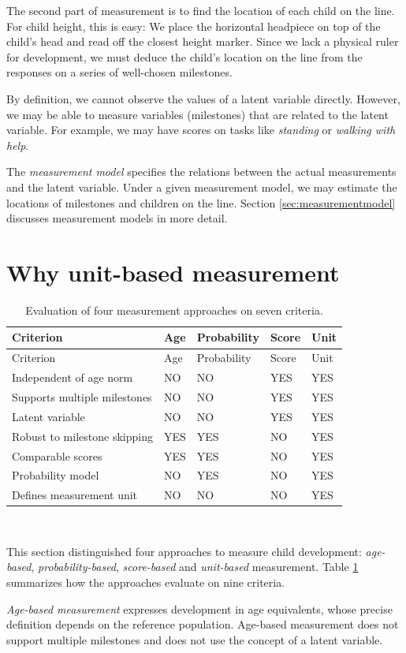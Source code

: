 \documentclass[
]{book}
\begin{document}
The second part of measurement is to find the location of each child on the line. For child height, this is easy: We place the horizontal headpiece on top of the child's head and read off the closest height marker. Since we lack a physical ruler for development, we must deduce the child's location on the line from the responses on a series of well-chosen milestones.

By definition, we cannot observe the values of a latent variable directly. However, we may be able to measure variables (milestones) that are related to the latent variable. For example, we may have scores on tasks like \emph{standing} or \emph{walking with help}.

The \emph{measurement model} specifies the relations between the actual measurements and the latent variable. Under a given measurement model, we may estimate the locations of milestones and children on the line. Section \ref{sec:measurementmodel} discusses measurement models in more detail.

\hypertarget{sec:whyunit}{%
\section{Why unit-based measurement}\label{sec:whyunit}}

\begin{longtable}[]{@{}lllll@{}}
\caption{\label{tab:measurement} Evaluation of four measurement approaches on seven criteria.}\tabularnewline
\toprule
Criterion & Age & Probability & Score & Unit\tabularnewline
\midrule
\endfirsthead
\toprule
Criterion & Age & Probability & Score & Unit\tabularnewline
\midrule
\endhead
Independent of age norm & NO & NO & YES & YES\tabularnewline
Supports multiple milestones & NO & NO & YES & YES\tabularnewline
Latent variable & NO & NO & YES & YES\tabularnewline
Robust to milestone skipping & YES & YES & NO & YES\tabularnewline
Comparable scores & YES & YES & NO & YES\tabularnewline
Probability model & NO & YES & NO & YES\tabularnewline
Defines measurement unit & NO & NO & NO & YES\tabularnewline
\bottomrule
\end{longtable}

~

This section distinguished four approaches to measure child development: \emph{age-based}, \emph{probability-based}, \emph{score-based} and \emph{unit-based} measurement. Table \ref{tab:measurement} summarizes how the approaches evaluate on nine criteria.

\emph{Age-based measurement} expresses development in age equivalents, whose precise definition depends on the reference population. Age-based measurement does not support multiple milestones and does not use the concept of a latent variable.
\end{document}
